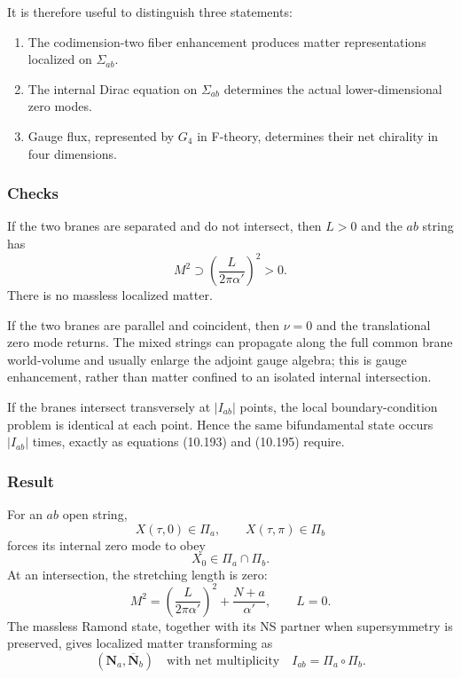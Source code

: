 \documentclass[
  10pt,
  a4paper,
  openany]{book}
\providecommand{\tightlist}{%
  \setlength{\itemsep}{0pt}\setlength{\parskip}{0pt}}
\begin{document}
It is therefore useful to distinguish three statements:

\begin{enumerate}
\def\labelenumi{\arabic{enumi}.}
\tightlist
\item
  The codimension-two fiber enhancement produces matter representations
  localized on \(\Sigma_{ab}\).
\item
  The internal Dirac equation on \(\Sigma_{ab}\) determines the actual
  lower-dimensional zero modes.
\item
  Gauge flux, represented by \(G_4\) in F-theory, determines their net
  chirality in four dimensions.
\end{enumerate}

\subsubsection{Checks}\label{checks-36}

If the two branes are separated and do not intersect, then \(L>0\) and
the \(ab\) string has \[
M^2\supset
\left(\frac{L}{2\pi\alpha'}\right)^2>0.
\] There is no massless localized matter.

If the two branes are parallel and coincident, then \(\nu=0\) and the
translational zero mode returns. The mixed strings can propagate along
the full common brane world-volume and usually enlarge the adjoint gauge
algebra; this is gauge enhancement, rather than matter confined to an
isolated internal intersection.

If the branes intersect transversely at \(|I_{ab}|\) points, the local
boundary-condition problem is identical at each point. Hence the same
bifundamental state occurs \(|I_{ab}|\) times, exactly as equations
(10.193) and (10.195) require.

\subsubsection{Result}\label{result-44}

For an \(ab\) open string, \[
X(\tau,0)\in\Pi_a,
\qquad
X(\tau,\pi)\in\Pi_b
\] forces its internal zero mode to obey \[
X_0\in\Pi_a\cap\Pi_b.
\] At an intersection, the stretching length is zero: \[
M^2
=\left(\frac{L}{2\pi\alpha'}\right)^2
+\frac{N+a}{\alpha'},
\qquad
L=0.
\] The massless Ramond state, together with its NS partner when
supersymmetry is preserved, gives localized matter transforming as \[
\boxed{
(\mathbf N_a,\overline{\mathbf N}_b)
\quad\text{with net multiplicity}\quad
I_{ab}=\Pi_a\circ\Pi_b
}.
\]
\end{document}
